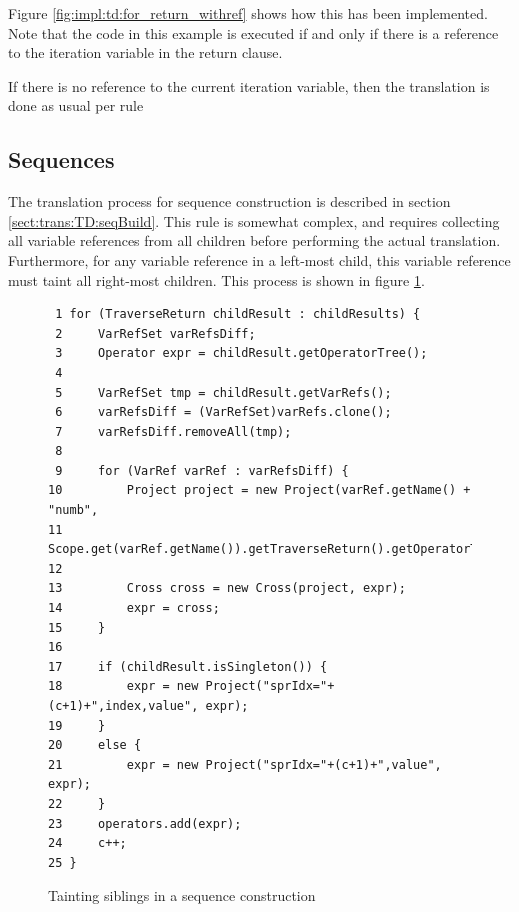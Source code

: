 Figure \ref{fig:impl:td:for_return_withref} shows how this has been
implemented. Note that the code in this example is executed if and only if
there is a reference to the iteration variable in the return clause.

If there is no reference to the current iteration variable, then the
translation is done as usual per rule 

\subsection{Sequences}
\label{sect:impl:td:seq}
The translation process for sequence construction is described in section
\ref{sect:trans:TD:seqBuild}. This rule is somewhat complex, and requires
collecting all variable references from all children before performing the
actual translation. Furthermore, for any variable reference in a left-most
child, this variable reference must taint all right-most children. This process
is shown in figure \ref{fig:impl:td:seq_constr_tainting_siblings}.


\begin{figure}[!htp]
\begin{center}
\begin{Verbatim}
 1 for (TraverseReturn childResult : childResults) {
 2     VarRefSet varRefsDiff;
 3     Operator expr = childResult.getOperatorTree();
 4     
 5     VarRefSet tmp = childResult.getVarRefs();
 6     varRefsDiff = (VarRefSet)varRefs.clone();
 7     varRefsDiff.removeAll(tmp);
 8 
 9     for (VarRef varRef : varRefsDiff) {
10         Project project = new Project(varRef.getName() + "numb", 
11                 Scope.get(varRef.getName()).getTraverseReturn().getOperatorTree());
12         
13         Cross cross = new Cross(project, expr);
14         expr = cross;
15     }
16 
17     if (childResult.isSingleton()) {
18         expr = new Project("sprIdx="+(c+1)+",index,value", expr);
19     }
20     else {
21         expr = new Project("sprIdx="+(c+1)+",value", expr);
22     }
23     operators.add(expr);
24     c++;
25 }
\end{Verbatim}
  \caption{Tainting siblings in a sequence construction}
  \label{fig:impl:td:seq_constr_tainting_siblings}
\end{center}
\end{figure}

